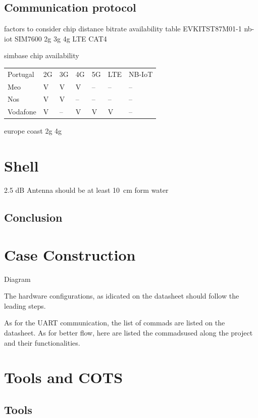 \subsection{Communication protocol}

factors to consider
chip
distance
bitrate
availability
table
EVKITST87M01-1 nb-iot
SIM7600 2g 3g 4g LTE CAT4

simbase chip availability

\begin{table}
    \centering
    \begin{tabular}{lllllll}
    Portugal & 2G & 3G & 4G & 5G & LTE & NB-IoT   \\
    Meo      & V  & V  & V  & -- & --  & --       \\
    Nos      & V  & V  & -- & -- & --  & --       \\
    Vodafone & V  & -- & V  & V  & V   & -- 
    \end{tabular}
\end{table}

europe coast
2g 4g


\section{Shell}
2.5 dB Antenna should be at least 10 cm form water 


\subsection{Conclusion}
\section{Case Construction}

Diagram


The hardware configurations, as idicated on the datasheet should follow the leading steps.

As for the UART communication, the list of commads are listed on the datasheet. 
As for better flow, here are listed the commadsused along the project and their functionalities. 



\section{Tools and COTS}
\subsection{Tools}
